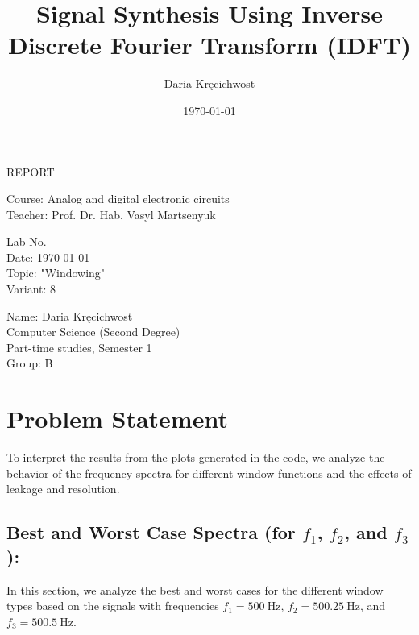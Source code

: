 \documentclass[12pt]{article}
\begin{document}
\title{Signal Synthesis Using Inverse Discrete Fourier Transform (IDFT)}
\author{Daria Kręcichwost}
\date{\today}

\begin{titlepage}
    \centering
    \vspace*{2cm}
    
    \Huge
    REPORT
    
    \vspace{1cm}
    
    \Large
    Course: Analog and digital electronic circuits \\
    Teacher: Prof. Dr. Hab. Vasyl Martsenyuk
    
    \vfill
    
    \Large
    Lab No. \\
    Date: \today \\
    Topic: "Windowing" \\
    Variant: 8
    
    \vspace{1cm}
    
    \large
    Name: Daria Kręcichwost \\
    Computer Science (Second Degree) \\
    Part-time studies, Semester 1 \\
    Group: B
\end{titlepage}

\newpage

\section{Problem Statement}

To interpret the results from the plots generated in the code, we analyze the behavior of the frequency spectra for different window functions and the effects of leakage and resolution.

\subsection*{Best and Worst Case Spectra (for \(f_1\), \(f_2\), and \(f_3\)):}

In this section, we analyze the best and worst cases for the different window types based on the signals with frequencies \(f_1 = 500 \ \text{Hz}\), \(f_2 = 500.25 \ \text{Hz}\), and \(f_3 = 500.5 \ \text{Hz}\).
\end{document}
